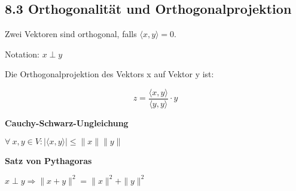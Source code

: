 \subsection{8.3 Orthogonalität und Orthogonalprojektion}{
\vskip1pt
Zwei Vektoren sind orthogonal, falls $\langle x, y \rangle = 0$. \par Notation: $x \perp y$ \par \vskip5pt
Die Orthogonalprojektion des Vektors x auf Vektor y ist:\par\vspace{-12pt}
\begin{center}
\[z = \frac{\langle x, y \rangle}{\langle y, y \rangle}\cdot y\]
\end{center}\vskip3pt

\textbf{Cauchy-Schwarz-Ungleichung}\par\vskip1pt
\begin{center}
$\forall\: x,y \in V: |\langle x,y \rangle| \leq \|x\| \|y\|$
\end{center}\vskip3pt

\textbf{Satz von Pythagoras}\par\vskip1pt
\begin{center}
$x\perp y \Rightarrow \|x + y\|^2 = \|x\|^2 + \|y\|^2$
\end{center}

}
\WhiteSpace